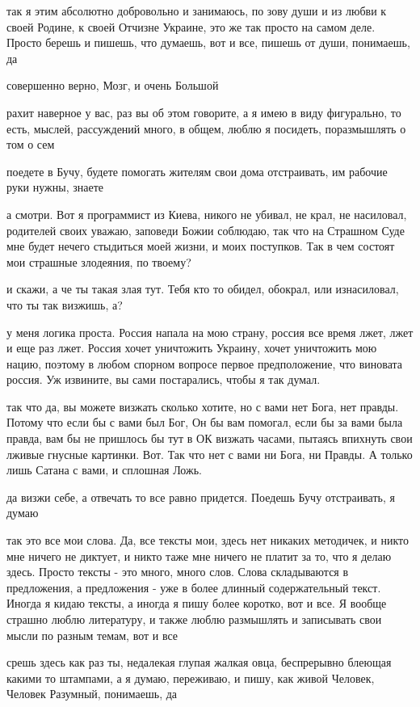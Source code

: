 так я этим абсолютно добровольно и занимаюсь, по зову души и из любви к своей
Родине, к своей Отчизне Украине, это же так просто на самом деле. Просто берешь
и пишешь, что думаешь, вот и все, пишешь от души, понимаешь, да

совершенно верно, Мозг, и очень Большой

рахит наверное у вас, раз вы об этом говорите, а я имею в виду фигурально, то
есть, мыслей, рассуждений много, в общем, люблю я посидеть, поразмышлять о том
о сем

поедете в Бучу, будете помогать жителям свои дома отстраивать, им рабочие руки
нужны, знаете


а смотри. Вот я программист из Киева, никого не убивал, не крал, не насиловал,
родителей своих уважаю, заповеди Божии соблюдаю, так что на Страшном Суде мне
будет нечего стыдиться моей жизни, и моих поступков. Так в чем состоят мои
страшные злодеяния, по твоему?

и скажи, а че ты такая злая тут. Тебя кто то обидел, обокрал, или изнасиловал,
что ты так визжишь, а?

у меня логика проста. Россия напала на мою страну, россия все время лжет, лжет
и еще раз лжет. Россия хочет уничтожить Украину, хочет уничтожить мою нацию,
поэтому в любом спорном вопросе первое предположение, что виновата россия. Уж
извините, вы сами постарались, чтобы я так думал.

так что да, вы можете визжать сколько хотите, но с вами нет Бога, нет правды.
Потому что если бы с вами был Бог, Он бы вам помогал, если бы за вами была
правда, вам бы не пришлось бы тут в ОК визжать часами, пытаясь впихнуть свои
лживые гнусные картинки. Вот. Так что нет с вами ни Бога, ни Правды. А только
лишь Сатана с вами, и сплошная Ложь.

да визжи себе, а отвечать то все равно придется. Поедешь Бучу отстраивать, я
думаю

так это все мои слова. Да, все тексты мои, здесь нет никаких методичек, и никто
мне ничего не диктует, и никто таже мне ничего не платит за то, что я делаю
здесь. Просто тексты - это много, много слов. Слова складываются в предложения,
а предложения - уже в более длинный содержательный текст. Иногда я кидаю
тексты, а иногда я пишу более коротко, вот и все. Я вообще страшно люблю
литературу, и также люблю размышлять и записывать свои мысли по разным темам,
вот и все


срешь здесь как раз ты, недалекая глупая жалкая овца, беспрерывно блеющая
какими то штампами, а я думаю, переживаю, и пишу, как живой Человек, Человек
Разумный, понимаешь, да

